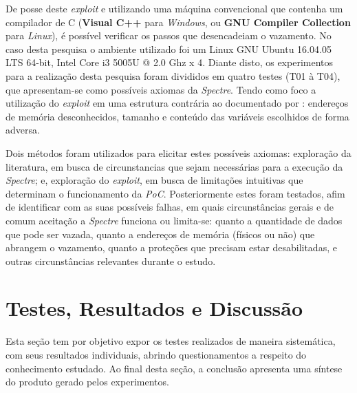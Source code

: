 \documentclass[
	article,			    %
	12pt,				    %
	oneside,			    %
	a4paper,			    %
	chapter=TITLE,		    %
	section=TITLE,		    %
	subsection=TITLE,	    %
	english,			    %
	brazil,				    %
	sumario=tradicional
]{abntex2}
\begin{document}
De posse deste \emph{exploit} e utilizando uma máquina convencional que contenha um compilador de C (\textbf{Visual C++} para \emph{Windows}, ou \textbf{GNU Compiler Collection} para \emph{Linux}), é possível verificar os passos que desencadeiam o vazamento. No caso desta pesquisa o ambiente utilizado foi um Linux GNU Ubuntu 16.04.05 LTS 64-bit, Intel\textsuperscript{\tiny\textregistered} Core\textsuperscript{\tiny\texttrademark} i3 5005U @ 2.0 Ghz x 4. Diante disto, os experimentos para a realização desta pesquisa foram divididos em quatro testes (T01 à T04), que apresentam-se como possíveis axiomas da \emph{Spectre}. Tendo como foco a utilização do \emph{exploit} em uma estrutura contrária ao documentado por : endereços de memória desconhecidos, tamanho e conteúdo das variáveis escolhidos de forma adversa.

Dois métodos foram utilizados para elicitar estes possíveis axiomas: exploração da literatura, em busca de circunstancias que sejam necessárias para a execução da \emph{Spectre}; e, exploração do \emph{exploit}, em busca de limitações intuitivas que determinam o funcionamento da \emph{PoC}. Posteriormente estes foram testados, afim de identificar com as suas possíveis falhas, em quais circunstâncias gerais e de comum aceitação a \emph{Spectre} funciona ou limita-se: quanto a quantidade de dados que pode ser vazada, quanto a endereços de memória (físicos ou não) que abrangem o vazamento, quanto a proteções que precisam estar desabilitadas, e outras circunstâncias relevantes durante o estudo.

\begin{comment}
Para a realização dos passos supradescritos, os ambientes utilizados foram: GNU Ubuntu 18.04.01 LTS 64-bit, Intel\textsuperscript{\tiny\textregistered} Core\textsuperscript{\tiny\texttrademark} i7 7500U @ 2.7 Ghz x 4; GNU Ubuntu 16.04.05 LTS 64-bit, Intel\textsuperscript{\tiny\textregistered} Core\textsuperscript{\tiny\texttrademark} i3 5005U @ 2.0 Ghz x 4.
\end{comment}

\section{Testes, Resultados e Discussão}
Esta seção tem por objetivo expor os testes realizados de maneira sistemática, com seus resultados individuais, abrindo questionamentos a respeito do conhecimento estudado. Ao final desta seção, a conclusão apresenta uma síntese do produto gerado pelos experimentos.
\end{document}
